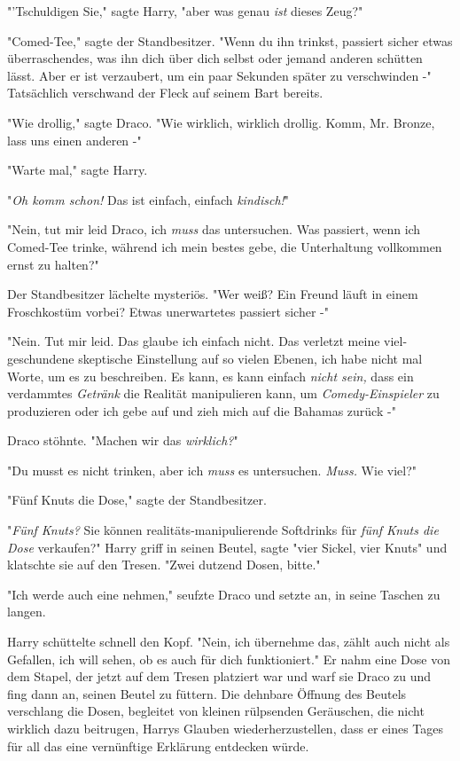 {"'Tschuldigen Sie," sagte Harry, "aber was genau \emph{ist} dieses Zeug?"

"Comed-Tee," sagte der Standbesitzer. "Wenn du ihn trinkst, passiert sicher etwas überraschendes, was ihn dich über dich selbst oder jemand anderen schütten lässt. Aber er ist verzaubert, um ein paar Sekunden später zu verschwinden -" Tatsächlich verschwand der Fleck auf seinem Bart bereits.

"Wie drollig," sagte Draco. "Wie wirklich, wirklich drollig. Komm, Mr. Bronze, lass uns einen anderen -"

"Warte mal," sagte Harry.

"\emph{Oh komm schon!} Das ist einfach, einfach \emph{kindisch!}"

"Nein, tut mir leid Draco, ich \emph{muss} das untersuchen. Was passiert, wenn ich Comed-Tee trinke, während ich mein bestes gebe, die Unterhaltung vollkommen ernst zu halten?"

Der Standbesitzer lächelte mysteriös. "Wer weiß? Ein Freund läuft in einem Froschkostüm vorbei? Etwas unerwartetes passiert sicher -"

"Nein. Tut mir leid. Das glaube ich einfach nicht. Das verletzt meine viel-geschundene skeptische Einstellung auf so vielen Ebenen, ich habe nicht mal Worte, um es zu beschreiben. Es kann, es kann einfach \emph{nicht sein,} dass ein verdammtes \emph{Getränk} die Realität manipulieren kann, um \emph{Comedy-Einspieler} zu produzieren oder ich gebe auf und zieh mich auf die Bahamas zurück -"

Draco stöhnte. "Machen wir das \emph{wirklich?}"

"Du musst es nicht trinken, aber ich \emph{muss} es untersuchen. \emph{Muss.} Wie viel?"

"Fünf Knuts die Dose," sagte der Standbesitzer.

"\emph{Fünf Knuts?} Sie können realitäts-manipulierende Softdrinks für \emph{fünf Knuts die Dose} verkaufen?" Harry griff in seinen Beutel, sagte "vier Sickel, vier Knuts" und klatschte sie auf den Tresen. "Zwei dutzend Dosen, bitte."

"Ich werde auch eine nehmen," seufzte Draco und setzte an, in seine Taschen zu langen.

Harry schüttelte schnell den Kopf. "Nein, ich übernehme das, zählt auch nicht als Gefallen, ich will sehen, ob es auch für dich funktioniert." Er nahm eine Dose von dem Stapel, der jetzt auf dem Tresen platziert war und warf sie Draco zu und fing dann an, seinen Beutel zu füttern. Die dehnbare Öffnung des Beutels verschlang die Dosen, begleitet von kleinen rülpsenden Geräuschen, die nicht wirklich dazu beitrugen, Harrys Glauben wiederherzustellen, dass er eines Tages für all das eine vernünftige Erklärung entdecken würde.

}
